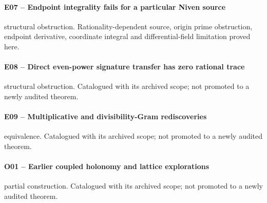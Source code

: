 \paragraph{E07 -- Endpoint integrality fails for a particular Niven source}\label{record-E07}
structural obstruction. Rationality-dependent source, origin prime obstruction, endpoint derivative, coordinate integral and differential-field limitation proved here.
\par\smallskip{}\par
\paragraph{E08 -- Direct even-power signature transfer has zero rational trace}\label{record-E08}
structural obstruction. Catalogued with its archived scope; not promoted to a newly audited theorem.
\par\smallskip{}\par
\paragraph{E09 -- Multiplicative and divisibility-Gram rediscoveries}\label{record-E09}
equivalence. Catalogued with its archived scope; not promoted to a newly audited theorem.
\par\smallskip{}\par
\paragraph{O01 -- Earlier coupled holonomy and lattice explorations}\label{record-O01}
partial construction. Catalogued with its archived scope; not promoted to a newly audited theorem.
\par\smallskip{}\par
